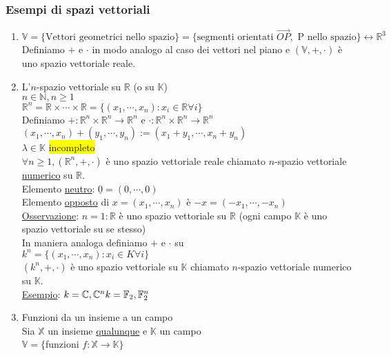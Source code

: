 \documentclass{article}
\newcommand{\hl}[1]{\colorbox{yellow}{#1}}
\newcommand{\ul}[1]{\underline{#1}}
\newcommand{\K}{\mathbb{K}}
\newcommand{\R}{\mathbb{R}}
\newcommand{\V}{\mathbb{V}}
\begin{document}
	\subsubsection*{Esempi di spazi vettoriali}
	\begin{enumerate}
		\item $\V=\{\text{Vettori geometrici nello spazio}\}=\{\text{segmenti orientati }\overrightarrow{OP},\text{ P nello spazio}\}\longleftrightarrow\R^3$\\
		      Definiamo $+$ e $\cdot$ in modo analogo al caso dei vettori nel piano e $(\V,+,\cdot)$ è uno spazio vettoriale reale.
		\item L'$n$-spazio vettoriale su $\R$ (o su $\K$)\\
		      $n\in\mathbb{N},n\ge1$\\
		      $\R^n=\R\times\cdots\times\R=\{(x_1,\cdots,x_n):x_i\in\R\forall i\}$\\
		      Definiamo $+:\R^n\times\R^n\to\R^n$ e $\cdot:\R^n\times\R^n\to\R^n$\\
		      $(x_1,\cdots,x_n)+(y_1,\cdots,y_n):=(x_1+y_1,\cdots,x_n+y_n)$\\
		      $\lambda\in\K$ \hl{incompleto}\\
		      $\forall n\ge1,(\R^n,+,\cdot)$ è uno spazio vettoriale reale chiamato $n$-spazio vettoriale \ul{numerico} su $\R$.\\
		      Elemento \ul{neutro}: $\ul{0}=(0,\cdots,0)$\\
		      Elemento \ul{opposto} di $x=(x_1,\cdots,x_n)$ è $-x=(-x_1,\cdots,-x_n)$\\
		      \ul{Osservazione}: $n=1:\R$ è uno spazio vettoriale su $\R$ (ogni campo $\K$ è uno spazio vettoriale su se stesso)\\
		      In maniera analoga definiamo $+$ e $\cdot$ su\\
		      $k^n=\{(x_1,\cdots,x_n):x_i\in K\forall i\}$\\
		      $(k^n,+,\cdot)$ è uno spazio vettoriale su $\K$ chiamato $n$-spazio vettoriale numerico su $\K$.\\
		      \ul{Esempio}: $k=\mathbb{C},\mathbb{C}^n\\k=\mathbb{F}_2,\mathbb{F}^n_2$
		\item Funzioni da un insieme a un campo\\
		      Sia $\mathbb{X}$ un insieme \ul{qualunque} e $\K$ un campo\\
		      $\V=\{$funzioni $f:\mathbb{X}\to\K\}$
		      \begin{itemize}

\end{itemize}
\end{enumerate}
\end{document}
